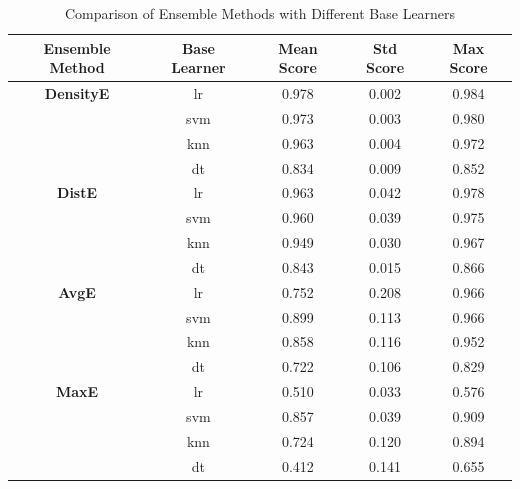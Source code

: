 \begin{table}[htbp]
		
	    \begin{center}
			
			\caption{Comparison of Ensemble Methods with Different Base Learners}
			
			\label{tab:ensemble_comparison}
			
			\begin{tabular}{|c|c|c|c|c|}
				
				\hline 
				
				\textbf{Ensemble Method} & \textbf{Base Learner} & \textbf{Mean Score} & \textbf{Std Score} & \textbf{Max Score} \\
				
				\hline
				
				\textbf{DensityE} & lr & 0.978 & 0.002 & 0.984 \\
				
				& svm & 0.973 & 0.003 & 0.980 \\
				
				& knn & 0.963 & 0.004 & 0.972 \\
				
				& dt & 0.834 & 0.009 & 0.852 \\
				
				\hline 
				
				\textbf{DistE} & lr & 0.963 & 0.042 & 0.978 \\
				
				& svm & 0.960 & 0.039 & 0.975 \\
				
				& knn & 0.949 & 0.030 & 0.967 \\
				
				& dt & 0.843 & 0.015 & 0.866 \\
				
				\hline 
				
				\textbf{AvgE} & lr & 0.752 & 0.208 & 0.966 \\
				
				& svm & 0.899 & 0.113 & 0.966 \\
				
				& knn & 0.858 & 0.116 & 0.952 \\
				
				& dt & 0.722 & 0.106 & 0.829 \\
				
				\hline 
				
				\textbf{MaxE} & lr & 0.510 & 0.033 & 0.576 \\
				
				& svm & 0.857 & 0.039 & 0.909 \\
				
				& knn & 0.724 & 0.120 & 0.894 \\
				
				& dt & 0.412 & 0.141 & 0.655 \\
				
				\hline
				
			\end{tabular}
			
		\end{center}
		
	\end{table}
